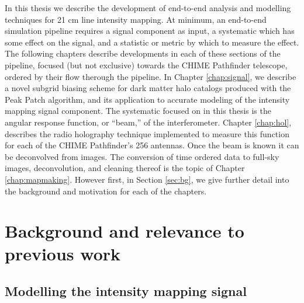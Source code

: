 In this thesis we describe the development of end-to-end analysis and modelling techniques for 21 cm line intensity mapping. At minimum, an end-to-end simulation pipeline requires a signal component as input, a systematic which has some effect on the signal, and a statistic or metric by which to measure the effect. The following chapters describe developments in each of these sections of the pipeline, focused (but not exclusive) towards the CHIME Pathfinder telescope, ordered by their flow therough the pipeline. In Chapter \ref{chap:signal}, we describe a novel subgrid biasing scheme for dark matter halo catalogs produced with the Peak Patch algorithm, and its application to accurate modeling of the intensity mapping signal component. The systematic focused on in this thesis is the angular response function, or ``beam,'' of the interferometer. Chapter \ref{chap:hol}, describes the radio holography technique implemented to measure this function for each of the CHIME Pathfinder's 256 antennas. Once the beam is known it can be deconvolved from images. The conversion of time ordered data to full-sky images, deconvolution, and cleaning thereof is the topic of Chapter \ref{chap:mapmaking}. However first, in Section \ref{sec:bg}, we give further detail into the background and motivation for each of the chapters.

\section{\label{sec:bg} Background and relevance to previous work}

\subsection{\label{sec:bg:subsec:signal} Modelling the intensity mapping signal}


